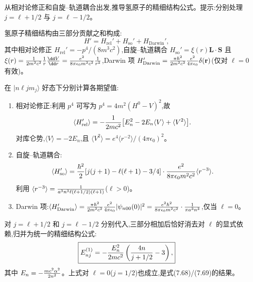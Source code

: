 \begin{question}
从相对论修正和自旋--轨道耦合出发,推导氢原子的精细结构公式。提示:分别处理 $j=\ell+1/2$ 与 $j=\ell-1/2$。
\begin{solution}
氢原子精细结构由三部分贡献之和构成:
\[
H' = H_{\text{rel}}' + H_{\text{so}}' + H_{\text{Darwin}}',
\]
其中相对论修正 $H_{\text{rel}}'=-p^4/(8m^3c^2)$,自旋--轨道耦合 $H_{\text{so}}'=\xi(r)\mathbf L\cdot\mathbf S$ 且 $\xi(r)={1\over2m^2c^2}{1\over r}{\dd V\over\dd r}={e^2\over8\pi\epsilon_0 m^2c^2}{1\over r^3}$,Darwin 项 $H_{\text{Darwin}}'={\pi\hbar^2\over2m^2c^2}{e^2\over4\pi\epsilon_0}\delta(\mathbf r)$(仅对 $\ell=0$ 有效)。

在 $|n\ell j m_j\rangle$ 好态下分别计算各期望值:
\begin{enumerate}
\item 相对论修正:利用 $p^4$ 可写为 $p^4=4m^2(H^0-V)^2$,故
\[
\langle H_{\text{rel}}'\rangle=-{1\over2mc^2}\bigl[E_n^2-2E_n\langle V\rangle+\langle V^2\rangle\bigr].
\]
对库仑势,$\langle V\rangle=-2E_n$,且 $\langle V^2\rangle=e^4\langle r^{-2}\rangle/(4\pi\epsilon_0)^2$。
\item 自旋--轨道耦合:
\[
\langle H_{\text{so}}'\rangle = {\hbar^2\over2}[j(j+1)-\ell(\ell+1)-3/4]\cdot{e^2\over8\pi\epsilon_0 m^2c^2}\langle r^{-3}\rangle.
\]
利用 $\langle r^{-3}\rangle={1\over a^3 n^3\ell(\ell+1/2)(\ell+1)}$($\ell>0$)。
\item Darwin 项:$\langle H_{\text{Darwin}}'\rangle = {\pi\hbar^2\over2m^2c^2}{e^2\over4\pi\epsilon_0}|\psi_{n00}(0)|^2 = {e^2\hbar^2\over8\pi\epsilon_0 m^2c^2}\cdot{1\over\pi a^3 n^3}$,仅当 $\ell=0$。
\end{enumerate}

对 $j=\ell+1/2$ 和 $j=\ell-1/2$ 分别代入,三部分相加后恰好消去对 $\ell$ 的显式依赖,归并为统一的精细结构公式:
\[
\boxed{E_{nj}^{(1)}=-{E_n^2\over2mc^2}\left({4n\over j+1/2}-3\right),}
\]
其中 $E_n=-{mc^2\alpha^2\over2n^2}$。上式对 $\ell=0$($j=1/2$)也成立,是式(7.68)/(7.69)的结果。
\end{solution}
\end{question}

